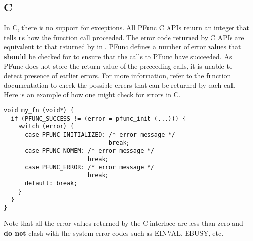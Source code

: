 \subsection{C}
In C, there is no support for exceptions. All PFunc C APIs return an integer
that tells us how the function call proceeded. The error code returned by C
APIs are equivalent to that returned by  in
\Cpp{}.  PFunc defines a number of error values that \textbf{should} be checked
for to ensure that the calls to PFunc have succeeded. As PFunc does not store
the return value of the preceeding calls, it is unable to detect presence of
earlier errors. For more information, refer to the function documentation to
check the possible errors that can be returned by each call.  Here is an
example of how one might check for errors in C.
%
\begin{lstlisting}
void my_fn (void*) {
  if (PFUNC_SUCCESS != (error = pfunc_init (...))) {
    switch (error) {
      case PFUNC_INITIALIZED: /* error message */
                              break;
      case PFUNC_NOMEM: /* error message */
                        break; 
      case PFUNC_ERROR: /* error message */
                        break;
      default: break;                  
    }
  }
}
\end{lstlisting}

%
Note that all the error values returned by the C interface are less than zero
and \textbf{do not} clash with the system error codes such as EINVAL, EBUSY,
etc.  
